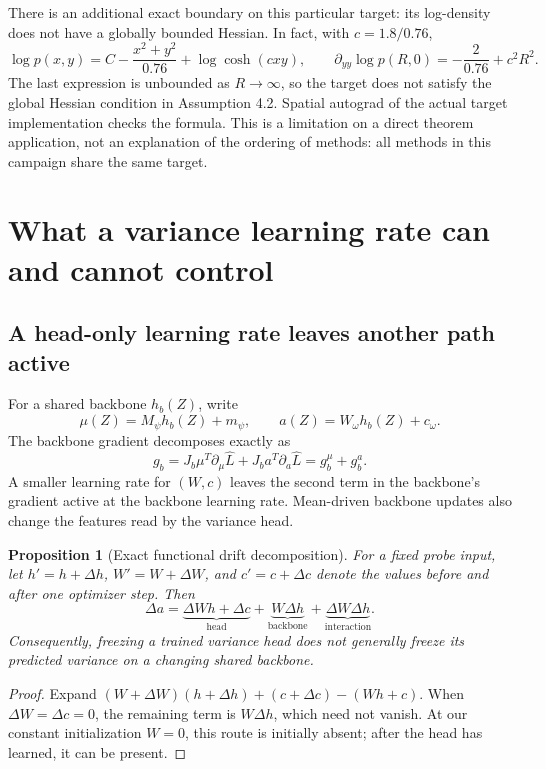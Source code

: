 \documentclass[11pt,a4paper]{article}
\newtheorem{proposition}{Proposition}[section]
\begin{document}
There is an additional exact boundary on this particular target: its log-density
does not have a globally bounded Hessian. In fact, with $c=1.8/0.76$,
\[
 \log p(x,y)=C-\frac{x^2+y^2}{0.76}+\log\cosh(cxy),\qquad
 \partial_{yy}\log p(R,0)=-\frac2{0.76}+c^2R^2.
\]
The last expression is unbounded as $R\to\infty$, so the target does not satisfy
the global Hessian condition in Assumption 4.2. Spatial autograd of the actual
target implementation checks the formula. This is a limitation on a direct
theorem application, not an explanation of the ordering of methods: all
methods in this campaign share the same target.

\section{What a variance learning rate can and cannot control}
\subsection{A head-only learning rate leaves another path active}
For a shared backbone $h_b(Z)$, write
\[
 \mu(Z)=M_\psi h_b(Z)+m_\psi,\qquad
 a(Z)=W_\omega h_b(Z)+c_\omega.
\]
The backbone gradient decomposes exactly as
\begin{equation}
 g_b=J_b\mu^T\partial_\mu\widehat L+J_b a^T\partial_a\widehat L
       =g_b^{\mu}+g_b^a.
 \label{eq:paths}
\end{equation}
A smaller learning rate for $(W,c)$ leaves the second term in the backbone's
gradient active at the backbone learning rate. Mean-driven backbone updates
also change the features read by the variance head.

\begin{proposition}[Exact functional drift decomposition]
For a fixed probe input, let $h'=h+\Delta h$, $W'=W+\Delta W$, and
$c'=c+\Delta c$ denote the values before and after one optimizer step. Then
\begin{equation}
 \Delta a=\underbrace{\Delta W h+\Delta c}_{\text{head}}
          +\underbrace{W\Delta h}_{\text{backbone}}
          +\underbrace{\Delta W\Delta h}_{\text{interaction}}.
 \label{eq:drift}
\end{equation}
Consequently, freezing a trained variance head does not generally freeze its
predicted variance on a changing shared backbone.
\end{proposition}
\begin{proof}
Expand $(W+\Delta W)(h+\Delta h)+(c+\Delta c)-(Wh+c)$.
When $\Delta W=\Delta c=0$, the remaining term is $W\Delta h$, which need
not vanish. At our constant initialization $W=0$, this route is initially
absent; after the head has learned, it can be present.
\end{proof}
\end{document}
